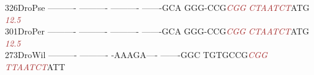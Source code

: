 \documentclass[11pt,twoside,reqno,a4paper]{article}
\begin{document}
{326\hspace*{1\charwidth}DroPse	----------	----------	----------	-------GCA	GGG-CCG\textit{\textcolor{Brown}{C}}\textit{\textcolor{Brown}{G}}\textit{\textcolor{Brown}{G}}	\textit{\textcolor{Brown}{C}}\textit{\textcolor{Brown}{T}}\textit{\textcolor{Brown}{A}}\textit{\textcolor{Brown}{A}}\textit{\textcolor{Brown}{T}}\textit{\textcolor{Brown}{C}}\textit{\textcolor{Brown}{T}}ATG	\\
\hspace*{4\charwidth}\hspace*{7\charwidth}\hspace*{1\charwidth}\hspace*{1\charwidth}\hspace*{1\charwidth}\hspace*{1\charwidth}\hspace*{47\charwidth}\textit{\textcolor{Brown}{12.5}}\hspace*{1\charwidth}\hspace*{1\charwidth}\\
301\hspace*{1\charwidth}DroPer	----------	----------	----------	-------GCA	GGG-CCG\textit{\textcolor{Brown}{C}}\textit{\textcolor{Brown}{G}}\textit{\textcolor{Brown}{G}}	\textit{\textcolor{Brown}{C}}\textit{\textcolor{Brown}{T}}\textit{\textcolor{Brown}{A}}\textit{\textcolor{Brown}{A}}\textit{\textcolor{Brown}{T}}\textit{\textcolor{Brown}{C}}\textit{\textcolor{Brown}{T}}ATG	\\
\hspace*{4\charwidth}\hspace*{7\charwidth}\hspace*{1\charwidth}\hspace*{1\charwidth}\hspace*{1\charwidth}\hspace*{1\charwidth}\hspace*{47\charwidth}\textit{\textcolor{Brown}{12.5}}\hspace*{1\charwidth}\hspace*{1\charwidth}\\
273\hspace*{1\charwidth}DroWil	----------	----------	-AAAGA----	-------GGC	TGTGCCG\textit{\textcolor{Brown}{C}}\textit{\textcolor{Brown}{G}}\textit{\textcolor{Brown}{G}}	\textit{\textcolor{Brown}{T}}\textit{\textcolor{Brown}{T}}\textit{\textcolor{Brown}{A}}\textit{\textcolor{Brown}{A}}\textit{\textcolor{Brown}{T}}\textit{\textcolor{Brown}{C}}\textit{\textcolor{Brown}{T}}ATT	\\
}
\end{document}
